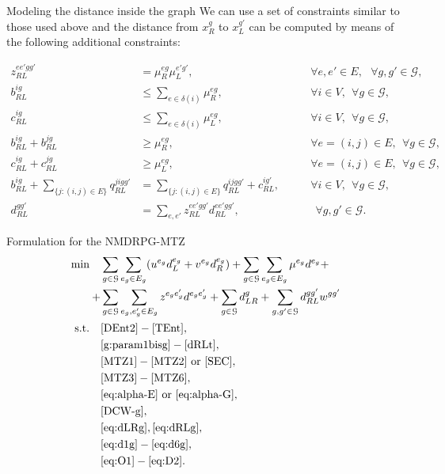 \documentclass[slidestop,usepdftitle=false,10pt]{beamer}
\begin{document}
	\begin{frame}{Modeling the distance inside the graph}
        We can use a set of constraints similar to those used above and the distance from $x_R^g$ to $x_L^{g'}$ can be computed by means of the following additional constraints:
        \begin{tiny}
        \begin{align}
            z_{RL}^{ee'gg'} & = \mu_{R}^{eg}\mu_L^{e'g'}, &\qquad \forall e,e' \in E,\:\:\ \forall g,g' \in \mathcal{G},\label{prodRLggN}\\
            b_{RL}^{ig} & \leq \sum_{e\in\delta(i)}\mu_{R}^{eg}, \label{bRt1}&\qquad \forall i\in V, \:\: \forall g \in \mathcal{G}, \\
            c_{RL}^{ig} & \leq \sum_{e\in\delta(i)}\mu_{L}^{eg}, \label{cRt1}&\qquad \forall i\in V, \:\: \forall g \in \mathcal{G},\\
            b_{RL}^{ig} + b_{RL}^{jg} & \geq \mu_R^{eg}, &\qquad \forall e=(i, j)\in E, \:\: \forall g \in \mathcal{G},\label{bRt2}\\
            c_{RL}^{ig} + c_{RL}^{jg} & \geq \mu_L^{eg}, &\qquad \forall e=(i, j)\in E, \:\: \forall g \in \mathcal{G},\label{cRt2}\\
            b_{RL}^{ig} + \sum_{\{j:(i, j)\in E\}} q_{RL}^{jigg'} & = \sum_{\{j:(i, j)\in E\}} q_{RL}^{ijgg'} +  c_{RL}^{ig'}, \label{flow}&\qquad \forall i \in V, \:\: \forall g \in \mathcal{G},\\
            d_{RL}^{gg'} & = \sum_{e, e'} z_{RL}^{ee'gg'} d_{RL}^{ee'gg'}, & \qquad\:\: \forall g,g' \in \mathcal{G}.\label{dRLt}
        \end{align}
        \end{tiny}
    \end{frame}
    
    \begin{frame}{Formulation for the NMDRPG-MTZ}
	\small
	\begin{align*}
	    \text{min}\quad &\sum_{g\in\mathcal G}\sum_{e_g\in E_g} (u^{e_g}d_L^{e_g} + v^{e_g}d_R^{e_g}) + \sum_{g\in\mathcal G}\sum_{e_g\in E_g} \mu^{e_g} d^{e_g} + \\
	    + & \sum_{g\in\mathcal G}\sum_{e_g,e^\prime_g\in E_g}z^{e_ge^\prime_g}d^{e_ge^\prime_g} + \sum_{g\in\mathcal G} d_{LR}^g + \sum_{g,g'\in \mathcal G}d_{RL}^{gg'}w^{gg'} \\
	    \text{s.t.}\quad & \eqref{DEnt2}-\eqref{TEnt}, \\
	    & \eqref{g:param1bisg}-\eqref{dRLt}, \\
	    & \eqref{MTZ1} - \eqref{MTZ2} \text{ or } \eqref{SEC}, \\
	    & \eqref{MTZ3} - \eqref{MTZ6}, \\
	    & \eqref{eq:alpha-E} \text{ or } \eqref{eq:alpha-G}, \\
	    & \eqref{DCW-g}, \\
	    & \eqref{eq:dLRg}, \eqref{eq:dRLg}, \\
	    & \eqref{eq:d1g}-\eqref{eq:d6g}, \\
	    & \eqref{eq:O1}-\eqref{eq:D2}.
	\end{align*}
	    
	\end{frame}
    
\end{document}
